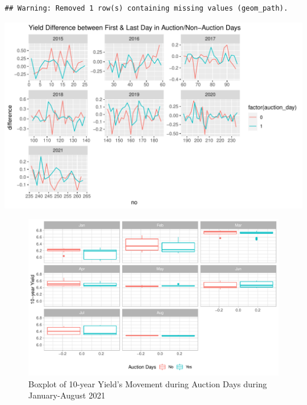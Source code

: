 \documentclass[11pt,a4paper,]{article}
\begin{document}
\begin{verbatim}
## Warning: Removed 1 row(s) containing missing values (geom_path).
\end{verbatim}

\includegraphics{Untitled_files/figure-latex/yielddif_line-2.pdf}

\begin{figure}
\centering
\includegraphics{Untitled_files/figure-latex/unnamed-chunk-21-1.pdf}
\caption[\label{fig:unnamed-chunk-21}Boxplot of 10-year Yield's Movement during Auction Days during January-August 2021]{\label{fig:unnamed-chunk-21}Boxplot of 10-year Yield's Movement during Auction Days during January-August 2021\footnotemark{}}
\end{figure}
\end{document}
